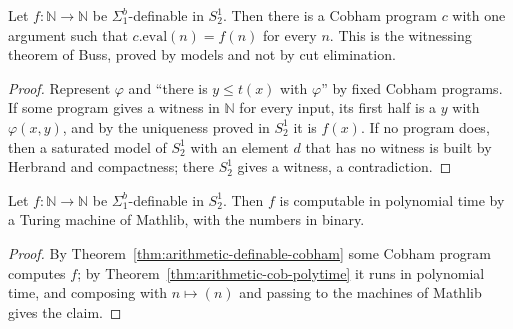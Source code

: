 \begin{theorem}
  \label{thm:arithmetic-definable-cobham}
  \leanok
  Let $f : \mathbb{N} \to \mathbb{N}$ be $\Sigma^b_1$-definable in $S^1_2$. Then there is a Cobham
  program $c$ with one argument such that $c.\mathrm{eval}(n) = f(n)$ for every $n$.
  This is the witnessing theorem of Buss, proved by models and not by cut elimination.
\end{theorem}

\begin{proof}
  \leanok
  Represent $\varphi$ and ``there is $y \le t(x)$ with $\varphi$'' by fixed Cobham programs. If some
  program gives a witness in $\mathbb{N}$ for every input, its first half is a $y$ with $\varphi(x,
  y)$, and by the uniqueness proved in $S^1_2$ it is $f(x)$. If no program does, then a saturated
  model of $S^1_2$ with an element $d$ that has no witness is built by Herbrand and compactness; there
  $S^1_2$ gives a witness, a contradiction.
\end{proof}

\begin{theorem}
  \label{thm:arithmetic-definable-polytime}
  \leanok
  Let $f : \mathbb{N} \to \mathbb{N}$ be $\Sigma^b_1$-definable in $S^1_2$. Then $f$ is computable in
  polynomial time by a Turing machine of Mathlib, with the numbers in binary.
\end{theorem}

\begin{proof}
  \leanok
  By Theorem~\ref{thm:arithmetic-definable-cobham} some Cobham program computes $f$; by
  Theorem~\ref{thm:arithmetic-cob-polytime} it runs in polynomial time, and composing with $n
  \mapsto (n)$ and passing to the machines of Mathlib gives the claim.
\end{proof}


